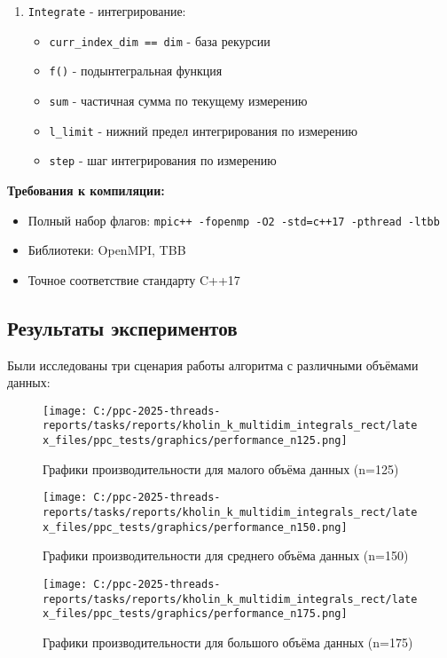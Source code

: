 \documentclass[14pt,a4paper]{article}
\begin{document}
\begin{enumerate}
\item \texttt{Integrate} - интегрирование:
  \begin{itemize}
  \item \texttt{curr\_index\_dim == dim} - база рекурсии
  \item \texttt{f()} - подынтегральная функция
  \item \texttt{sum} - частичная сумма по текущему измерению
  \item \texttt{l\_limit} - нижний предел интегрирования по измерению
  \item \texttt{step} - шаг интегрирования по измерению
  \end{itemize}
\end{enumerate}

\textbf{Требования к компиляции:}
\begin{itemize}
\item Полный набор флагов: \texttt{mpic++ -fopenmp -O2 -std=c++17 -pthread -ltbb}
\item Библиотеки: OpenMPI, TBB
\item Точное соответствие стандарту C++17
\end{itemize}

\subsection{Результаты экспериментов}
Были исследованы три сценария работы алгоритма с различными объёмами данных:

\begin{figure}[H]
\centering
\texttt{[image: C:/ppc-2025-threads-reports/tasks/reports/kholin\_k\_multidim\_integrals\_rect/latex\_files/ppc\_tests/graphics/performance\_n125.png]}
\caption{Графики производительности для малого объёма данных (n=125)}
\label{fig:small}
\end{figure}

\begin{figure}[H]
\centering
\texttt{[image: C:/ppc-2025-threads-reports/tasks/reports/kholin\_k\_multidim\_integrals\_rect/latex\_files/ppc\_tests/graphics/performance\_n150.png]}
\caption{Графики производительности для среднего объёма данных (n=150)}
\label{fig:medium}
\end{figure}

\begin{figure}[H]
\centering
\texttt{[image: C:/ppc-2025-threads-reports/tasks/reports/kholin\_k\_multidim\_integrals\_rect/latex\_files/ppc\_tests/graphics/performance\_n175.png]}
\caption{Графики производительности для большого объёма данных (n=175)}
\label{fig:large}
\end{figure}
\end{document}

